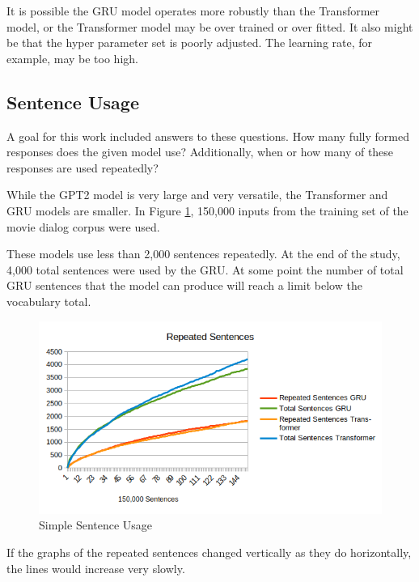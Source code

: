 It is possible the GRU model operates more robustly than the Transformer model, or the Transformer model may be over trained or over fitted. It also might be that the hyper parameter set is poorly adjusted. The learning rate, for example, may be too high.

\subsection{Sentence Usage}
A goal for this work included answers to these questions.
How many fully formed responses does the given model use? Additionally, when or how many of these responses are used repeatedly?

While the GPT2 model is very large and very versatile, the Transformer and GRU models are smaller. In Figure \ref{diagram-words-limit-shown}, 150,000 inputs from the training set of the movie dialog corpus were used. 

These models use less than 2,000 sentences repeatedly. At the end of the study, 4,000 total sentences were used by the GRU. At some point the number of total GRU sentences that the model can produce will reach a limit below the vocabulary total.

\begin{figure}[H]
	\begin{center}
		\includegraphics[scale=0.75]{diagram-output-repeated-02}
		
		
	\end{center}
	\caption[Simple Sentence Usage]{Simple Sentence Usage}
	\label{diagram-words-limit-shown}
	
\end{figure}

If the graphs of the repeated sentences changed vertically as they do horizontally, the lines would increase very slowly.

